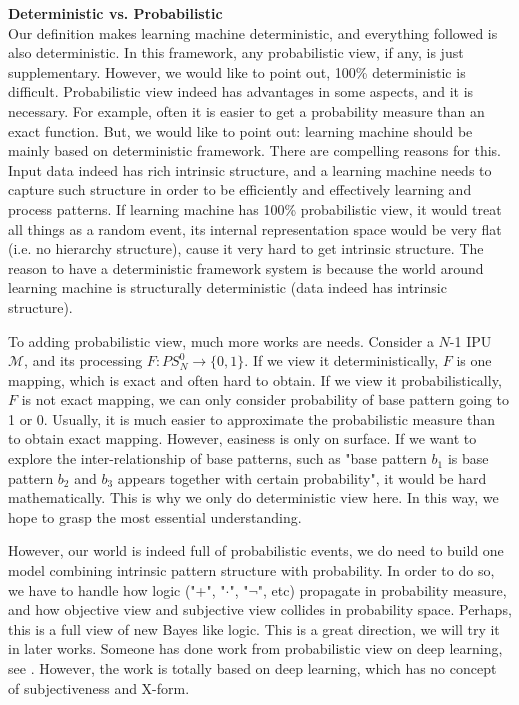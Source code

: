 {\bf Deterministic vs. Probabilistic}\\
Our definition makes learning machine deterministic, and everything followed is also deterministic. In this framework, any probabilistic view, if any, is just supplementary. However, we would like to point out, 100\% deterministic is difficult. Probabilistic view indeed has advantages in some aspects, and it is necessary. For example, often it is easier to get a probability measure than an exact function. But, we would like to point out: learning machine should be mainly based on deterministic framework. There are compelling reasons for this. Input data indeed has rich intrinsic structure, and a learning machine needs to capture such structure in order to be efficiently and effectively learning and process patterns. If learning machine has 100\% probabilistic view, it would treat all things as a random event, its internal representation space would be very flat (i.e. no hierarchy structure), cause it very hard to get intrinsic structure. The reason to have a deterministic framework system is because the world around learning machine is structurally deterministic (data indeed has intrinsic structure). 

To adding probabilistic view, much more works are needs. Consider a $N$-1 IPU $\mathcal{M}$, and its processing $F: PS^0_N \rightarrow \{0, 1\}$. If we view it deterministically, $F$ is one mapping, which is exact and often hard to obtain. If we view it probabilistically, $F$ is not exact mapping, we can only consider probability of base pattern going to 1 or 0. Usually, it is much easier to approximate the probabilistic measure than to obtain exact mapping. However, easiness is only on surface. If we want to explore the inter-relationship of base patterns, such as "base pattern $b_1$ is base pattern $b_2$ and $b_3$ appears together with certain probability", it would be hard mathematically. This is why we only do deterministic view here. In this way, we hope to grasp the most essential understanding. 

However, our world is indeed full of probabilistic events, we do need to build one model combining intrinsic pattern structure with probability. In order to do so, we have to handle how logic ("+", "$\cdot$", "$\neg$", etc) propagate in probability measure, and how objective view and subjective view collides in probability space. Perhaps, this is a full view of new Bayes like logic. This is a great direction, we will try it in later works. Someone has done work from probabilistic view on deep learning, see \cite{gal}. However, the work is totally based on deep learning, which has no concept of subjectiveness and X-form. \\


